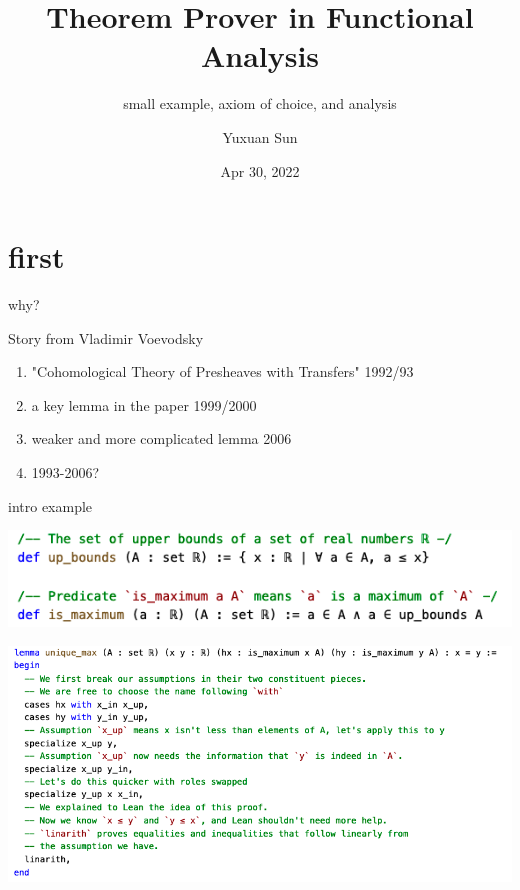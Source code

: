 \documentclass{beamer}
\title{Theorem Prover in Functional Analysis}
\subtitle{small example, axiom of choice, and analysis}
\date{Apr 30, 2022}
\author{Yuxuan Sun}
\institute{Haverford College}
\begin{document}
	
\begin{frame}
\titlepage
\end{frame}

\section{first}


\begin{frame}{why?}

Story from Vladimir Voevodsky

\begin{enumerate}
	\item "Cohomological Theory of Presheaves with Transfers" 1992/93
	\item a key lemma in the paper 1999/2000
	\item weaker and more complicated lemma 2006
	\item 1993-2006?
\end{enumerate}

\end{frame}

\begin{frame}{intro example}
	\begin{center} \includegraphics[scale=.4]{def.jpg}\end{center}	
	\begin{center}
		\includegraphics[scale=.4]{unique_max_long.jpg}
	\end{center}
\end{frame}
\end{document}
